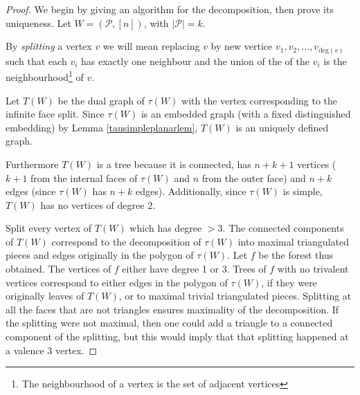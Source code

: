 \documentclass[11pt]{article}
\newcommand{\hlfix}[2]{\texthl{#1}\todo{#2}}
\newcommand{\cP}{\mathcal{P}}
\theoremstyle{remark}
\theoremstyle{definition}
\begin{document}
\begin{proof}
We begin by giving an algorithm for the decomposition, then prove its uniqueness. Let $W = (\cP, [n])$, with $|\cP| = k$.

By \emph{splitting} a vertex $v$ we will mean replacing $v$ by new vertice $v_1, v_2,\ldots, v_{\text{deg}(v)}$ such that each $v_i$ has exactly one neighbour and the union of the of the $v_i$ is the neighbourhood\footnote{The neighbourhood of a vertex is the set of adjacent vertices} of $v$.

Let $T(W)$ be the dual graph of $\tau(W)$ with the vertex corresponding to the infinite face split.
Since $\tau(W)$ is an embedded graph (with a fixed distinguished embedding) by Lemma \ref{tausimpleplanarlem}, $T(W)$ is an uniquely defined graph.

Furthermore $T(W)$ is a tree because it is connected, has $n+k+1$ vertices ($k+1$ from the internal faces of $\tau(W)$ and $n$ from the outer face) and $n+k$ edges (since $\tau(W)$ has $n+k$ edges).  Additionally, since $\tau(W)$ is simple, $T(W)$ has no vertices of degree $2$.  


Split every vertex of $T(W)$ which has degree $>3$.
The connected components of $T(W)$ correspond to the decomposition of $\tau(W)$ into maximal triangulated pieces and edges originally in the polygon of $\tau(W)$.  Let $f$ be the forest thus obtained.
The vertices of $f$ either have degree 1 or 3.
Trees of $f$ with no trivalent vertices correspond to either edges in the polygon of $\tau(W)$, if they were originally leaves of $T(W)$, or to maximal trivial triangulated pieces.
Splitting at all the faces that are not triangles ensures maximality of the decomposition. If the splitting were not maximal, then one could add a triangle to a connected component of the splitting, but this would imply that that splitting happened at a valence $3$ vertex.


\end{proof}
\end{document}
